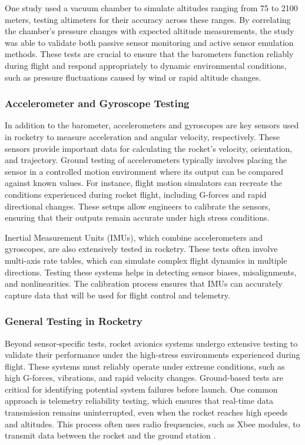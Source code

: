 One study used a vacuum chamber to simulate altitudes ranging from 75 to 2100 meters, testing altimeters for their accuracy across these ranges. By correlating the chamber's pressure changes with expected altitude measurements, the study was able to validate both passive sensor monitoring and active sensor emulation methods. These tests are crucial to ensure that the barometers function reliably during flight and respond appropriately to dynamic environmental conditions, such as pressure fluctuations caused by wind or rapid altitude changes.

\subsubsection{Accelerometer and Gyroscope Testing}
In addition to the barometer, accelerometers and gyroscopes are key sensors used in rocketry to measure acceleration and angular velocity, respectively. These sensors provide important data for calculating the rocket's velocity, orientation, and trajectory. Ground testing of accelerometers typically involves placing the sensor in a controlled motion environment where its output can be compared against known values. For instance, flight motion simulators can recreate the conditions experienced during rocket flight, including G-forces and rapid directional changes. These setups allow engineers to calibrate the sensors, ensuring that their outputs remain accurate under high stress conditions.  

Inertial Measurement Units (IMUs), which combine accelerometers and gyroscopes, are also extensively tested in rocketry. These tests often involve multi-axis rate tables, which can simulate complex flight dynamics in multiple directions. Testing these systems helps in detecting sensor biases, misalignments, and nonlinearities.  The calibration process ensures that IMUs can accurately capture data that will be used for flight control and telemetry.  

\subsubsection{General Testing in Rocketry}
Beyond sensor-specific tests, rocket avionics systems undergo extensive testing to validate their performance under the high-stress environments experienced during flight. These systems must reliably operate under extreme conditions, such as high G-forces, vibrations, and rapid velocity changes. Ground-based tests are critical for identifying potential system failures before launch. One common approach is telemetry reliability testing, which ensures that real-time data transmission remains uninterrupted, even when the rocket reaches high speeds and altitudes. This process often uses radio frequencies, such as Xbee modules, to transmit data between the rocket and the ground station \cite{rocket_telemetry}.

